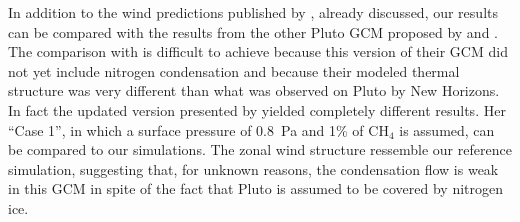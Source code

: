 In addition to the wind predictions published by \cite{Toig:15}, already  discussed, our
results can be compared with the results from the other Pluto GCM proposed by 
\cite{Zalu:13}
and \cite{Zalu:16}. The comparison with \cite{Zalu:13} is difficult to achieve
because this version of their GCM did not yet include nitrogen condensation and because their
modeled thermal structure was very different than what was observed on Pluto by New Horizons. In
fact the updated version presented by \cite{Zalu:16} yielded completely different results. Her 
``Case 1'', in which a surface pressure of 0.8~Pa and 1\% of CH$_4$ is assumed, can be compared
to our simulations. The zonal wind structure ressemble our reference simulation, suggesting that,
for unknown reasons, the condensation flow is weak in this GCM in spite of the fact that Pluto is
assumed to be covered by nitrogen ice.

